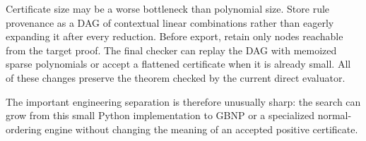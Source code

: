Certificate size may be a worse bottleneck than polynomial size. Store rule provenance as a DAG of contextual linear combinations rather than eagerly expanding it after every reduction. Before export, retain only nodes reachable from the target proof. The final checker can replay the DAG with memoized sparse polynomials or accept a flattened certificate when it is already small. All of these changes preserve the theorem checked by the current direct evaluator.

The important engineering separation is therefore unusually sharp: the search can grow from this small Python implementation to GBNP or a specialized normal-ordering engine without changing the meaning of an accepted positive certificate.
